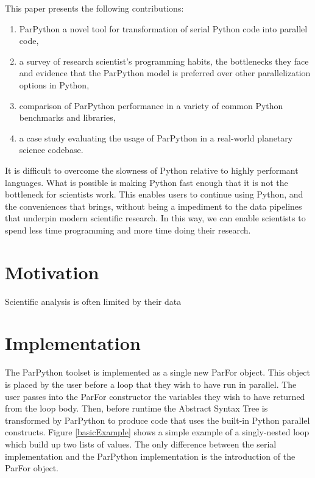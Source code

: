 \documentclass[conference]{IEEEtran}
\begin{document}
This paper presents the following contributions: 
\begin{enumerate}
    \item ParPython a novel tool for transformation of serial Python code
    into parallel code,
    \item a survey of research scientist's programming habits, the
    bottlenecks they face and evidence that the ParPython model is 
    preferred over other parallelization options in Python,
    \item comparison of ParPython performance in a variety of 
    common Python benchmarks and libraries,
    \item a case study evaluating the usage of ParPython in
    a real-world planetary science codebase. 
\end{enumerate}

It is difficult to overcome the slowness of Python relative to
highly performant languages.
What is possible is making Python fast enough that it is not the 
bottleneck for scientists work.
This enables users to continue using Python, and the conveniences that 
brings, without being a impediment to the data pipelines that underpin 
modern scientific research.
In this way, we can enable scientists to spend less time programming and 
more time doing their research.







\section{Motivation}

Scientific analysis is often limited by their data

\section{Implementation}

The ParPython toolset is implemented as a single new ParFor object. 
This object is placed by the user before a loop that they wish to have run in parallel. 
The user passes into the ParFor constructor the variables they wish to have returned from the loop body.
Then, before runtime the Abstract Syntax Tree is transformed by ParPython to produce code that uses the built-in Python parallel constructs.
Figure \ref{basicExample} shows a simple example of a singly-nested loop which build up two lists of values.
The only difference between the serial implementation and the ParPython implementation is the introduction of the ParFor object.
\end{document}
